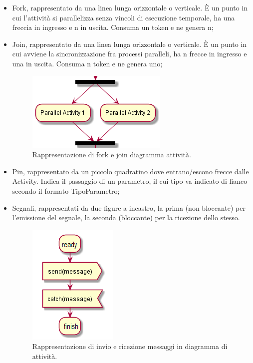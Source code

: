 \documentclass[NormeDiProgetto.tex]{subfiles}
\begin{document}
\begin{itemize}
\item Fork, rappresentato da una linea lunga orizzontale o verticale. \`E un punto in cui l'attività si parallelizza senza vincoli di esecuzione temporale, ha una freccia in ingresso e n in uscita. Consuma un token e ne genera n;
\item Join, rappresentato da una linea lunga orizzontale o verticale. \`E un punto in cui avviene la sincronizzazione fra processi paralleli, ha n frecce in ingresso e una in uscita. Consuma n token e ne genera uno;
\begin{figure}[H]
	\centering
	\includegraphics[width=0.4\linewidth]{progettazione/activityparall}
	\caption{Rappresentazione di fork e join diagramma attività.}
	\label{fig:activityparall}
\end{figure}

\item Pin, rappresentato da un piccolo quadratino dove entrano/escono frecce dalle Activity. Indica il passaggio di un parametro, il cui tipo va indicato di fianco secondo il formato TipoParametro;
\item Segnali, rappresentati da due figure a incastro, la prima (non bloccante) per
l'emissione del segnale, la seconda (bloccante) per la ricezione dello stesso.
\begin{figure}[H]
	\centering
	\includegraphics[width=0.3\linewidth]{progettazione/message}
	\caption{Rappresentazione di invio e ricezione messaggi in diagramma di attività.}
	\label{fig:message}
\end{figure}


\end{itemize}
\end{document}
